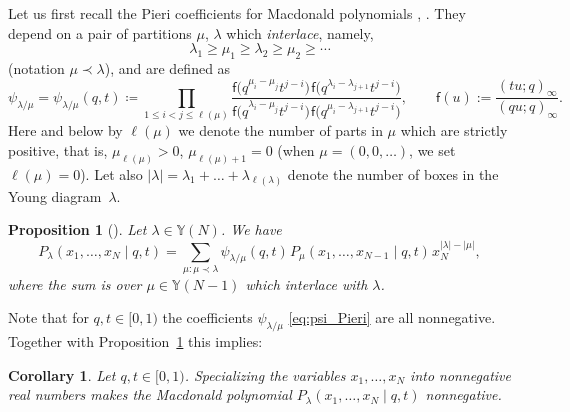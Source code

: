 \documentclass[pdftex]{sigma}
\numberwithin{equation}{section}
\newtheorem{Corollary}[Theorem]{Corollary}
\newtheorem{Proposition}[Theorem]{Proposition}
{ \theoremstyle{definition}
\newtheorem{Definition}[Theorem]{Definition}}
\begin{document}
Let us first recall the Pieri coefficients for Macdonald polynomials
\cite[formula~(VI.6.24.ii)]{Macdonald1995},
\cite[formula~(2.11)]{BorodinCorwin2011Macdonald}.
They depend on a pair of partitions $\mu$, $\lambda$
which \emph{interlace}, namely,
\begin{equation*}%
	\lambda_1\ge \mu_1\ge \lambda_2\ge \mu_2\ge \cdots
\end{equation*}
(notation $\mu\prec \lambda$), and are defined as
\begin{equation}
	\label{eq:psi_Pieri}
	\psi_{\lambda/\mu}
	=
	\psi_{\lambda/\mu}(q,t)
	\coloneqq
	\prod_{1\le i<j\le \ell(\mu)}
	\frac{\mathsf{f}\big(q^{\mu_i-\mu_j}t^{j-i}\big)
	\hspace{1pt}\mathsf{f}\big(q^{\lambda_i-\lambda_{j+1}}t^{j-i}\big)}
	{\mathsf{f}\big(q^{\lambda_i-\mu_j}t^{j-i}\big)
	\hspace{1pt}\mathsf{f}\big(q^{\mu_i-\lambda_{j+1}}t^{j-i}\big)},
	\qquad
	\mathsf{f}(u):=\frac{(tu;q)_{\infty}}{(qu;q)_{\infty}}.
\end{equation}
Here and below by $\ell(\mu)$ we denote the number of
parts in $\mu$ which are strictly positive,
that is, $\mu_{\ell(\mu)}>0$, $\mu_{\ell(\mu)+1}=0$ (when $\mu=(0,0,\dots )$, we set $\ell(\mu)=0$).
Let also $|\lambda|=\lambda_1+\dots+\lambda_{\ell(\lambda)}$
denote the number of boxes in the Young diagram~$\lambda$.

\begin{Proposition}[{\cite[formula~(VI.7.13$'$)]{Macdonald1995}}]
	\label{prop:branching}
	Let $\lambda\in \mathbb{Y}(N)$.
	We have
	\begin{equation}
		\label{eq:branching}
		P_\lambda(x_1,\dots,x_N \mid q,t)
		=
		\sum_{\mu\colon\mu\prec\lambda}
		\psi_{\lambda/\mu}(q,t)\hspace{1pt} P_\mu(x_1,\dots,x_{N-1} \mid q,t )\hspace{1pt}
		x_N^{|\lambda|-|\mu|},
	\end{equation}
	where the sum is over
	$\mu\in \mathbb{Y}(N-1)$ which interlace with $\lambda$.
\end{Proposition}

Note that for $q,t\in [0,1)$ the coefficients $\psi_{\lambda/\mu}$
\eqref{eq:psi_Pieri} are all nonnegative.
Together with Proposition~\ref{prop:branching} this implies:
\begin{Corollary}
	\label{cor:nonnegative_spec}
	Let $q,t\in[0,1)$. Specializing the variables
	$x_1,\dots,x_N $ into
	nonnegative real numbers
	makes the Macdonald polynomial
	$P_\lambda(x_1,\dots,x_N\mid q,t)$ nonnegative.
\end{Corollary}
\end{document}
